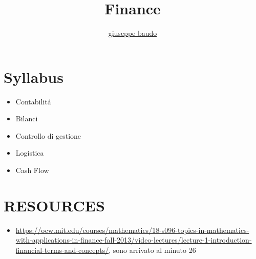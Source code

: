 \documentclass[a4paper,10pt]{article}
\title{Finance}
\author{\href{http://www.baudo.hol.es}{giuseppe baudo}}
\begin{document}
\maketitle

\section{Syllabus}

\begin{itemize}
 \item Contabilit\'{a}
 \item Bilanci
 \item Controllo di gestione
 \item Logistica
 \item Cash Flow
\end{itemize}



\section{RESOURCES}
\begin{itemize}
 \item \url{https://ocw.mit.edu/courses/mathematics/18-s096-topics-in-mathematics-with-applications-in-finance-fall-2013/video-lectures/lecture-1-introduction-financial-terms-and-concepts/}, sono arrivato al minuto 26
\end{itemize}
\end{document}
